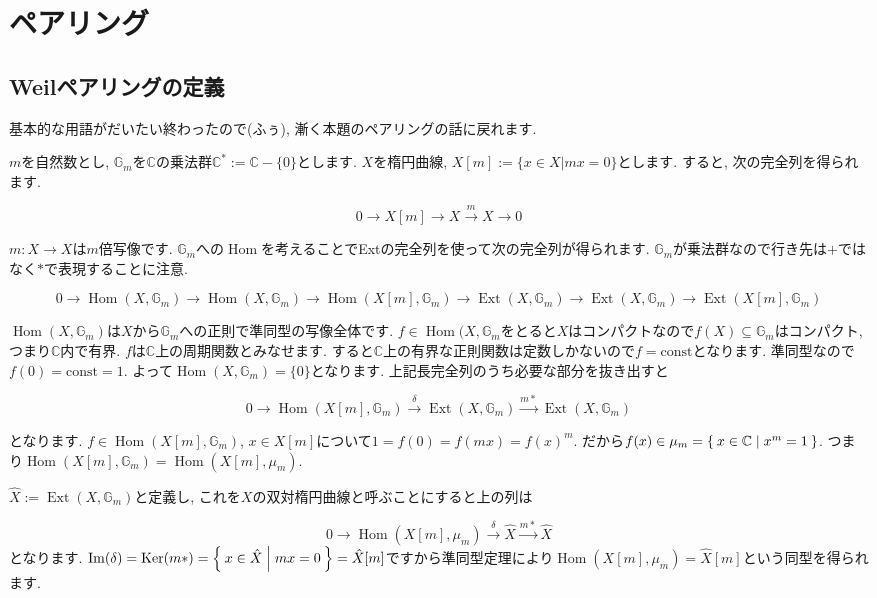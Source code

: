\documentclass{jsarticle}
\newcommand{\CC}{\mathbb{C}}
\newcommand{\GG}{\mathbb{G}}
\newcommand{\makeop}[1]{\mathop{\mathrm{#1}}\nolimits}
\def\Im{\makeop{Im}}
\def\Ker{\makeop{Ker}}
\def\Hom{\makeop{Hom}}
\def\Ext{\makeop{Ext}}
\theoremstyle{definition}
\numberwithin{theorem}{section}
\begin{document}
\section{ペアリング}

\subsection{Weilペアリングの定義}
基本的な用語がだいたい終わったので(ふぅ), 漸く本題のペアリングの話に戻れます.

$m$を自然数とし, $\GG_m$を$\CC$の乗法群$\CC^* := \CC - \{0\}$とします. $X$を楕円曲線, $X[m] := \{x \in X | mx = 0\}$とします. すると, 次の完全列を得られます. 

\begin{equation*}
0 \rightarrow X[m] \rightarrow X \xrightarrow{m} X \rightarrow 0
\end{equation*}

$m : X \rightarrow X$は$m$倍写像です. $\GG_m$への$\Hom$を考えることでExtの完全列を使って次の完全列が得られます. 
$\GG_m$が乗法群なので行き先は$+$ではなく$*$で表現することに注意. 

\begin{equation*}
0 \rightarrow \Hom(X, \GG_m) \rightarrow \Hom(X, \GG_m) \rightarrow \Hom(X[m], \GG_m) \rightarrow \Ext(X, \GG_m) \rightarrow \Ext(X, \GG_m) \rightarrow \Ext(X[m], \GG_m)
\end{equation*}

$\Hom(X, \GG_m)$は$X$から$\GG_m$への正則で準同型の写像全体です. $f\in\Hom(X, \GG_m$をとると$X$はコンパクトなので$f(X) \subseteq\GG_m$はコンパクト, つまり$\CC$内で有界. $f$は$\CC$上の周期関数とみなせます. すると$\CC$上の有界な正則関数は定数しかないので$f = \mathrm{const}$となります. 準同型なので$f(0) = \mathrm{const} = 1$. よって$\Hom(X, \GG_m) = \{0\}$となります. 上記長完全列のうち必要な部分を抜き出すと

\begin{equation*}
0 \rightarrow \Hom(X[m], \GG_m) \xrightarrow{\delta} \Ext(X, \GG_m) \xrightarrow{m*} \Ext(X, \GG_m)
\end{equation*}

となります. $f \in \Hom(X[m], \GG_m)$, $x \in X[m]$について$1 = f(0) = f(mx) = f(x)^m$. だから$f(x) \in \mu_m = \Set{x \in \CC | x^m = 1}$. つまり$\Hom(X[m], \GG_m) = \Hom(X[m], \mu_m)$.

$\hat{X} := \Ext(X, \GG_m)$と定義し, これを$X$の双対楕円曲線と呼ぶことにすると上の列は

\begin{equation*}
0 \rightarrow \Hom(X[m], \mu_m) \xrightarrow{\delta} \hat{X} \xrightarrow{m*} \hat{X}
\end{equation*}
となります. $\Im(\delta) = \Ker(m*) = \Set{x \in \hat{X} | mx = 0} = \hat{X}[m]$ですから準同型定理により$\Hom(X[m], \mu_m) = \hat{X}[m]$という同型を得られます.
\end{document}

